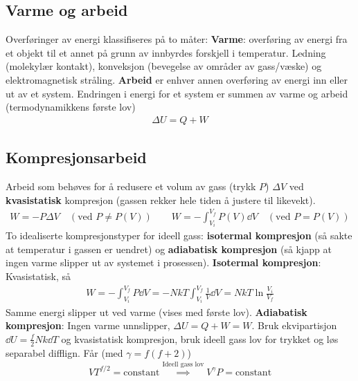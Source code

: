 \documentclass[12pt]{article}
\begin{document}
\subsection{Varme og arbeid}
Overføringer av energi klassifiseres på to måter: \newline \noindent
\textbf{Varme}: overføring av energi fra et objekt til et annet på grunn av innbyrdes forskjell i temperatur. Ledning (molekylær
kontakt), konveksjon (bevegelse av områder av gass/væske) og elektromagnetisk stråling.\newline \noindent
\textbf{Arbeid} er enhver annen overføring av energi inn eller ut av et system.
\newline \noindent
Endringen i energi for et system er summen av varme og arbeid (termodynamikkens første lov)
\begin{align*}
  \Delta{U} = Q + W
\end{align*}
\subsection{Kompresjonsarbeid}
Arbeid som behøves for å redusere et volum av gass (trykk $P$) $\Delta V$ ved
\textbf{kvasistatisk} kompresjon (gassen rekker hele tiden å justere til likevekt).
\begin{align*}
  W = -P \Delta{V} \quad (\text{ved } P \neq P(V))\qquad W = - \int_{V_i}^{V_f} P(V) \dd V \quad (\text{ved } P = P(V))
\end{align*}
To idealiserte kompresjonstyper for ideell gass: \textbf{isotermal kompresjon}
(så sakte at temperatur i gassen er uendret) og \textbf{adiabatisk kompresjon}
(så kjapp at ingen varme slipper ut av systemet i prosessen). \newline \noindent
\textbf{Isotermal kompresjon}: Kvasistatisk, så
\begin{align*}
  W = -\int_{V_i}^{V_f} P \dd V = -NkT \int_{V_i}^{V_f} \frac{1}{V} \dd V = NkT \ln{\frac{V_i}{V_f}}
\end{align*}
Samme energi slipper ut ved varme (vises med første lov).\newline \noindent
\textbf{Adiabatisk kompresjon}: Ingen varme unnslipper, $\Delta U = Q + W = W$.
Bruk ekvipartisjon $\dd U = \frac{f}{2} N k \dd T$ og kvasistatisk kompresjon,
bruk ideell gass lov for trykket og løs separabel difflign. Får (med $\gamma = f(f+2)$)
\begin{align*}
  V T^{f/2} = \text{constant} \overset{\text{Ideell gass lov}}{\implies} V^\gamma P = \text{constant}
\end{align*}
\end{document}
